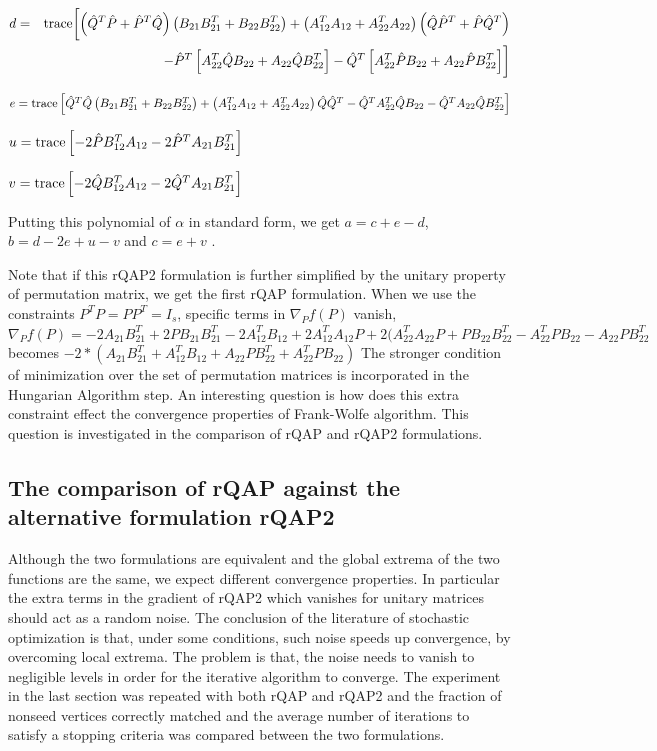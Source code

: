 \documentclass[12pt,oneside,final]{thesis}\usepackage[]{graphicx}\usepackage[]{color}
\begin{document}
\noindent 
\begin{eqnarray*}
d & = & \textup{trace}\biggl[\left(\hat{Q}^{T}\hat{P}+\hat{P}^{T}\hat{Q}\right)\left(B_{21}B_{21}^{T}+B_{22}B_{22}^{T}\right)+\left(A_{12}^{T}A_{12}+A_{22}^{T}A_{22}\right)\left(\hat{Q}\hat{P}^{T}+\hat{P}\hat{Q}^{T}\right)\\
 &  & -\hat{P}^{T}\left[A_{22}^{T}\hat{Q}B_{22}+A_{22}\hat{Q}B_{22}^{T}\right]-\hat{Q}^{T}\left[A_{22}^{T}\hat{P}B_{22}+A_{22}\hat{P}B_{22}^{T}\right]\biggr]
\end{eqnarray*}


$e=\textup{trace}\left[\hat{Q}^{T}\hat{Q}\left(B_{21}B_{21}^{T}+B_{22}B_{22}^{T}\right)+\left(A_{12}^{T}A_{12}+A_{22}^{T}A_{22}\right)\hat{Q}\hat{Q}^{T}-\hat{Q}^{T}A_{22}^{T}\hat{Q}B_{22}-\hat{Q}^{T}A_{22}\hat{Q}B_{22}^{T}\right]$

$u=\textup{trace}\left[-2\hat{P}B_{12}^{T}A_{12}-2\hat{P}^{T}A_{21}B_{21}^{T}\right]$

$v=\textup{trace}\left[-2\hat{Q}B_{12}^{T}A_{12}-2\hat{Q}^{T}A_{21}B_{21}^{T}\right]$

Putting this polynomial of $\alpha$ in standard form, we get $a=c+e-d$,
$b=d-2e+u-v$ and $c=e+v$ .

Note that if this rQAP2 formulation is further simplified  by the unitary property of permutation  matrix, we get the first rQAP formulation. When we use the constraints $P^TP=PP^T=I_{s}$, specific terms in $\nabla_{P}f(P)$ vanish,
$\nabla_{P}f(P)=-2A_{21}B_{21}^{T}+2PB_{21}B_{21}^{T}-2A_{12}^{T}B_{12}+2A_{12}^{T}A_{12}P+2(A_{22}^{T}A_{22}P+PB_{22}B_{22}^{T}-A_{22}^{T}PB_{22}-A_{22}PB_{22}^{T}$
becomes $-2*(A_{21}B_{21}^T+A_{12}^TB_{12}+A_{22}PB_{22}^T+A_{22}^TPB_{22})$
The stronger condition of minimization over the set of permutation matrices is incorporated in the Hungarian Algorithm step.
An interesting question is how does this extra constraint effect the convergence properties of Frank-Wolfe algorithm.  This question is investigated in the comparison of rQAP and rQAP2 formulations.  

\subsection{The comparison of rQAP against the alternative formulation rQAP2}
Although the two formulations are equivalent and the global extrema of the two functions are the same, we expect different convergence  properties. In particular the extra terms in the gradient of rQAP2 which vanishes for unitary matrices should act as a random noise. The conclusion of the literature of stochastic optimization  is that, under some conditions, such noise speeds up convergence, by overcoming local extrema. The problem is that, the noise needs to vanish to negligible levels in order for the iterative algorithm to converge. 
The experiment in the last  section was repeated with both rQAP and rQAP2 and the fraction of nonseed vertices correctly matched and the average number of iterations to satisfy a stopping criteria was compared between the two formulations. 
\end{document}
